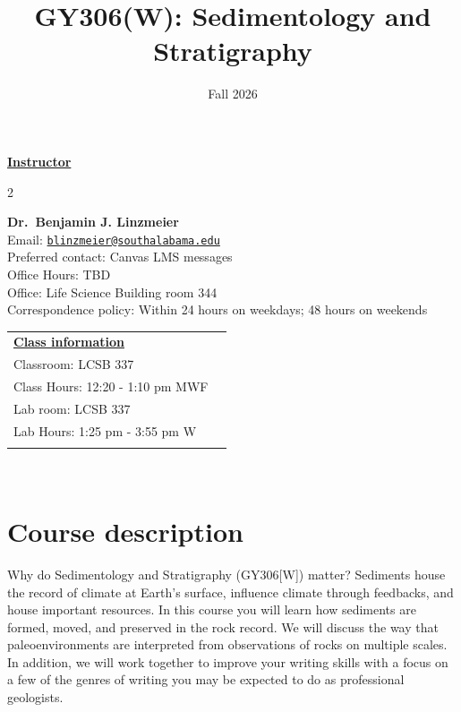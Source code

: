 \documentclass[11pt,]{article}
\title{GY306(W): Sedimentology and Stratigraphy}
\date{Fall 2026}
\begin{document}
  

		\maketitle
		
	
		\thispagestyle{firststyle}

\textbf{\underline{Instructor}}
\begin{multicols}{2}

  \textbf{Dr.~Benjamin J. Linzmeier}\\
  Email: \href{mailto:blinzmeier@southalabama.edu}{\nolinkurl{blinzmeier@southalabama.edu}}\\
  Preferred contact: Canvas LMS messages\\
  Office Hours: TBD\\
  Office: Life Science Building room 344\\
  Correspondence policy: Within 24 hours on weekdays; 48 hours on
weekends\\
    \columnbreak
    
  \end{multicols}
	
\noindent \begin{tabular*}{\textwidth}{ @{\extracolsep{\fill}} lr @{\extracolsep{\fill}}}
\textbf{\underline{Class information}}\\
  Classroom: LCSB 337\\
  Class Hours: 12:20 - 1:10 pm MWF\\
    Lab room: LCSB 337\\
  Lab Hours: 1:25 pm - 3:55 pm W\\
    \\
	\end{tabular*}\\


\vspace{2mm}


\section{Course description}\label{course-description}

Why do Sedimentology and Stratigraphy (GY306{[}W{]}) matter? Sediments
house the record of climate at Earth's surface, influence climate
through feedbacks, and house important resources. In this course you
will learn how sediments are formed, moved, and preserved in the rock
record. We will discuss the way that paleoenvironments are interpreted
from observations of rocks on multiple scales. In addition, we will work
together to improve your writing skills with a focus on a few of the
genres of writing you may be expected to do as professional geologists.
\end{document}
